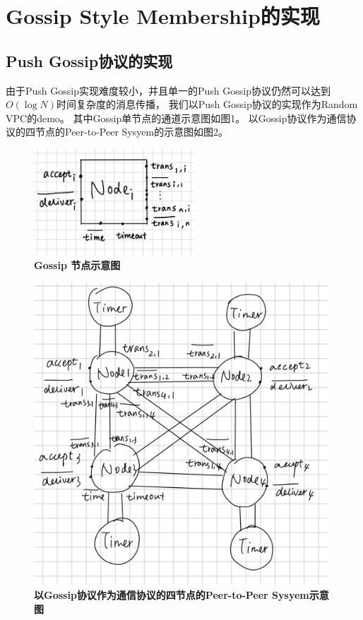 \section{Gossip Style Membership的实现}
\subsection{Push Gossip协议的实现}
由于Push Gossip实现难度较小，并且单一的Push Gossip协议仍然可以达到$O(\log N)$时间复杂度的消息传播，
我们以Push Gossip协议的实现作为Random VPC的demo。
其中Gossip单节点的通道示意图如图1。
以Gossip协议作为通信协议的四节点的Peer-to-Peer Sysyem的示意图如图2。

\begin{figure}[!htbp]
	\small
	\centering
	\includegraphics[width=6cm]{../figure/gossip1.jpg}
    \caption{\textbf{Gossip 节点示意图}}
    \label{fig1}
\end{figure}

\begin{figure}[!htbp]
	\small
	\centering
	\includegraphics[width=11cm]{../figure/gossip2.jpg}
    \caption{\textbf{以Gossip协议作为通信协议的四节点的Peer-to-Peer Sysyem示意图}}
    \label{fig2}
\end{figure}

